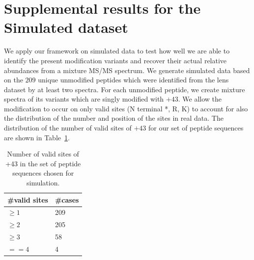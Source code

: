 \setcounter{page}{1}
\setcounter{figure}{0}  %

\section{Supplemental results for the Simulated dataset} \label{sec:simulation}

We apply our framework on simulated data to test how well we are able to identify the present modification variants and recover their actual relative abundances from a mixture MS/MS spectrum. We generate simulated data based on the $209$ unique unmodified peptides which were identified from the lens dataset by at least two spectra. For each unmodified peptide, we create mixture spectra of its variants which are singly modified with $+43$. We allow the modification to occur on only valid sites (N terminal *, R, K) to account for also the distribution of the number and position of the sites in real data. The distribution of the number of valid sites of $+43$ for our set of peptide sequences are shown in Table~\ref{tbl:SimDistNumValidSites}.

\begin{table}[h]
\centering
\caption{Number of valid sites of +43 in the set of peptide sequences chosen for simulation.}
\label{tbl:SimDistNumValidSites}
\begin{tabular}{|l|l|}
\hline
\#valid sites & \#cases\\
\hline
$\ge 1$ & 209 \\
\hline
$\ge 2$ & 205 \\
\hline
$\ge 3$ & 58 \\
\hline
$== 4$ & 4 \\
\hline
\end{tabular}
\end{table}

